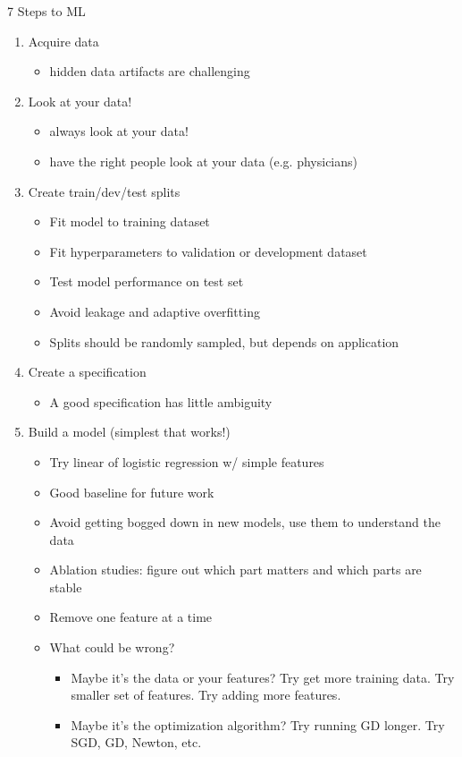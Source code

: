 \documentclass[../main.tex]{subfiles}
\begin{document}
7 Steps to ML
\begin{enumerate}
  \item Acquire data
  \begin{itemize}
    \item hidden data artifacts are challenging
  \end{itemize}
  \item Look at your data!
  \begin{itemize}
    \item always look at your data!
    \item have the right people look at your data (e.g. physicians)
  \end{itemize}
  \item Create train/dev/test splits
  \begin{itemize}
    \item Fit model to training dataset
    \item Fit hyperparameters to validation or development dataset
    \item Test model performance on test set
    \item Avoid leakage and adaptive overfitting
    \item Splits should be randomly sampled, but depends on application
  \end{itemize}
  \item Create a specification
  \begin{itemize}
    \item A good specification has little ambiguity
  \end{itemize}
  \item Build a model (simplest that works!)
  \begin{itemize}
    \item Try linear of logistic regression w/ simple features
    \item Good baseline for future work
    \item Avoid getting bogged down in new models, use them to understand the data
    \item Ablation studies: figure out which part matters and which parts are stable
    \item Remove one feature at a time
    \item What could be wrong?
    \begin{itemize}
      \item Maybe it's the data or your features? Try get more training data. Try smaller set of features. Try adding more features.
      \item Maybe it's the optimization algorithm? Try running GD longer. Try SGD, GD, Newton, etc.

\end{itemize}
\end{itemize}
\end{enumerate}
\end{document}
